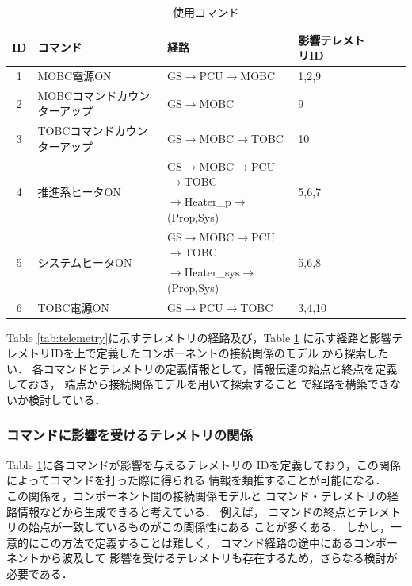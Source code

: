 \documentclass[11pt]{article}
\begin{document}
\begin{table}[H]
   \centering
   \caption{使用コマンド}
   \label{tab:command}
      \begin{tabular}{clllccc} \hline
         ID&コマンド&経路&影響テレメトリID\\ \hline
         1&MOBC電源ON&GS$\rightarrow$PCU$\rightarrow$MOBC&1,2,9\\
         2&MOBCコマンドカウンターアップ&GS$\rightarrow$MOBC&9\\
         3&TOBCコマンドカウンターアップ&GS$\rightarrow$MOBC$\rightarrow$TOBC&10\\
         \multirow{2}{*}{4}&\multirow{2}{*}{推進系ヒータON}&GS$\rightarrow$MOBC$\rightarrow$PCU$\rightarrow$TOBC&\multirow{2}{*}{5,6,7}\\
         &&$\rightarrow$Heater\_p$\rightarrow$(Prop,Sys)&\\
         \multirow{2}{*}{5}&\multirow{2}{*}{システムヒータON}&GS$\rightarrow$MOBC$\rightarrow$PCU$\rightarrow$TOBC&\multirow{2}{*}{5,6,8}\\
         &&$\rightarrow$Heater\_sys$\rightarrow$(Prop,Sys)&\\
         6&TOBC電源ON&GS$\rightarrow$PCU$\rightarrow$TOBC&3,4,10\\ \hline
      \end{tabular}
\end{table}

Table \ref{tab:telemetry}に示すテレメトリの経路及び，Table \ref{tab:command}
に示す経路と影響テレメトリIDを上で定義したコンポーネントの接続関係のモデル
から探索したい．
各コマンドとテレメトリの定義情報として，情報伝達の始点と終点を定義しておき，
端点から接続関係モデルを用いて探索すること
で経路を構築できないか検討している．


\subsubsection{コマンドに影響を受けるテレメトリの関係}
Table \ref{tab:command}に各コマンドが影響を与えるテレメトリの
IDを定義しており，この関係によってコマンドを打った際に得られる
情報を類推することが可能になる．\\
この関係を，コンポーネント間の接続関係モデルと
コマンド・テレメトリの経路情報などから生成できると考えている．
例えば，
コマンドの終点とテレメトリの始点が一致しているものがこの関係性にある
ことが多くある．
しかし，一意的にこの方法で定義することは難しく，
コマンド経路の途中にあるコンポーネントから波及して
影響を受けるテレメトリも存在するため，さらなる検討が必要である．
\end{document}
